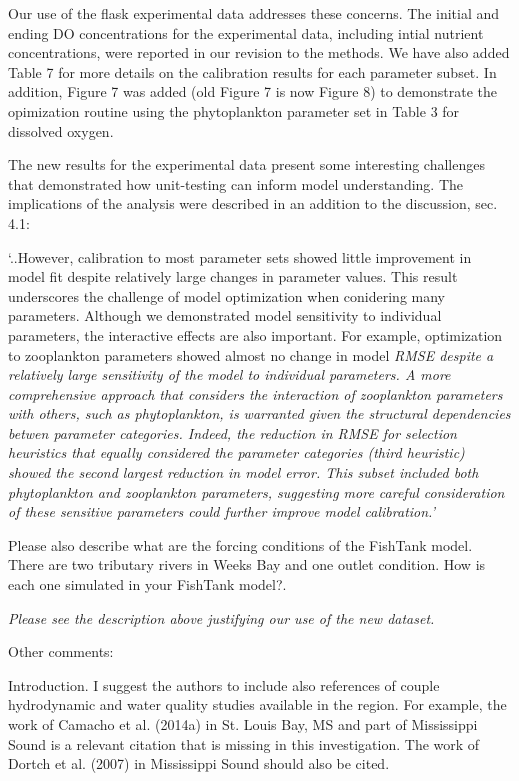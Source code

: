 \documentclass[letterpaper,12pt]{article}\usepackage[]{graphicx}\usepackage[]{color}
\begin{document}
{\it

Our use of the flask experimental data addresses these concerns.  The initial and ending DO concentrations for the experimental data, including intial nutrient concentrations, were reported in our revision to the methods. We have also added Table 7 for more details on the calibration results for each parameter subset.  In addition, Figure 7 was added (old Figure 7 is now Figure 8) to demonstrate the opimization routine using the phytoplankton parameter set in Table 3 for dissolved oxygen.

The new results for the experimental data present some interesting challenges that demonstrated how unit-testing can inform model understanding.  The implications of the analysis were described in an addition to the discussion, sec. 4.1:

`..However, calibration to most parameter sets showed little improvement in model fit despite relatively large changes in parameter values.  This result underscores the challenge of model optimization when conidering many parameters.  Although we demonstrated model sensitivity to individual parameters, the interactive effects are also important.  For example, optimization to zooplankton parameters showed almost no change in model \it{RMSE} despite a relatively large sensitivity of the model to individual parameters.  A more comprehensive approach that considers the interaction of zooplankton parameters with others, such as phytoplankton, is warranted given the structural dependencies betwen parameter categories.  Indeed, the reduction in \it{RMSE} for selection heuristics that equally considered the parameter categories (third heuristic) showed the second largest reduction in model error.  This subset included both phytoplankton and zooplankton parameters, suggesting more careful consideration of these sensitive parameters could further improve model calibration.'

}

Please also describe what are the forcing conditions of the FishTank model. There are two tributary rivers in Weeks Bay and one outlet condition. How is each one simulated in your FishTank model?.

{\it Please see the description above justifying our use of the new dataset.}

Other comments:

Introduction. I suggest the authors to include also references of couple hydrodynamic and water quality studies available in the region. For example, the work of Camacho et al. (2014a) in St. Louis Bay, MS and part of Mississippi Sound is a relevant citation that is missing in this investigation. The work of Dortch et al. (2007) in Mississippi Sound should also be cited. 
\end{document}
